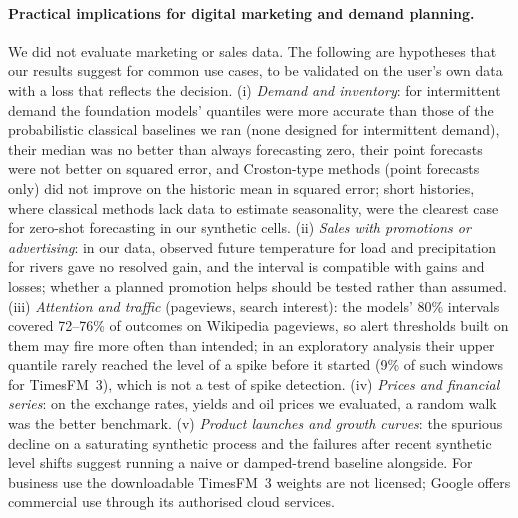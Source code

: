 \paragraph{Practical implications for digital marketing and demand planning.} We did not evaluate marketing or sales data. The
following are hypotheses that our results suggest for common use cases, to be validated on the user's own data with a loss that
reflects the decision. (i) \emph{Demand and inventory}: for intermittent demand the foundation models' quantiles were more
accurate than those of the probabilistic classical baselines we ran (none designed for intermittent demand), their median was no
better than always forecasting zero, their point forecasts were not better on squared error, and
Croston-type methods (point forecasts only) did not improve on the historic mean in squared error; short histories, where classical methods lack data to estimate seasonality, were the clearest case for zero-shot
forecasting in our synthetic cells. (ii) \emph{Sales with promotions or advertising}: in our data, observed future temperature
for load and precipitation for rivers gave no resolved gain, and the interval is compatible with gains and losses; whether a
planned promotion helps should be tested rather than assumed. (iii) \emph{Attention and traffic} (pageviews, search interest):
the models' 80\% intervals covered 72--76\% of outcomes on Wikipedia pageviews, so alert thresholds built on them may fire more
often than intended; in an exploratory analysis their upper quantile rarely reached the level of a spike before it started (9\%
of such windows for TimesFM~3), which is not a test of spike detection. (iv) \emph{Prices and financial series}: on the exchange
rates, yields and oil prices we evaluated, a random walk was the better benchmark. (v) \emph{Product launches and growth curves}:
the spurious decline on a saturating synthetic process and the failures after recent synthetic level shifts suggest running a naive
or damped-trend baseline alongside. For business use the downloadable TimesFM~3 weights are not licensed; Google offers commercial use through its authorised
cloud services.

